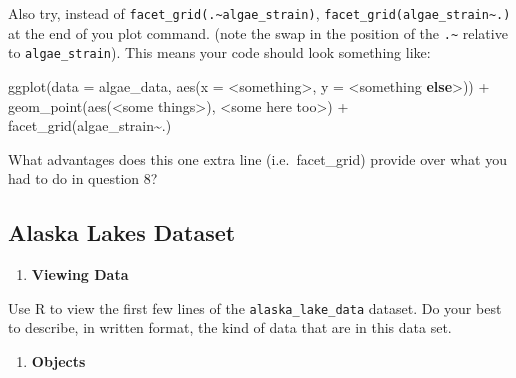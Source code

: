 \documentclass[
]{krantz}
\newenvironment{Shaded}{\begin{snugshade}}{\end{snugshade}}
\newcommand{\AttributeTok}[1]{\textcolor[rgb]{0.77,0.63,0.00}{#1}}
\newcommand{\ControlFlowTok}[1]{\textcolor[rgb]{0.13,0.29,0.53}{\textbf{#1}}}
\newcommand{\FunctionTok}[1]{\textcolor[rgb]{0.00,0.00,0.00}{#1}}
\newcommand{\NormalTok}[1]{#1}
\newcommand{\SpecialCharTok}[1]{\textcolor[rgb]{0.00,0.00,0.00}{#1}}
\providecommand{\tightlist}{%
  \setlength{\itemsep}{0pt}\setlength{\parskip}{0pt}}
\begin{document}
Also try, instead of \texttt{facet\_grid(.\textasciitilde{}algae\_strain)}, \texttt{facet\_grid(algae\_strain\textasciitilde{}.)} at the end of you plot command. (note the swap in the position of the \texttt{.\textasciitilde{}} relative to \texttt{algae\_strain}). This means your code should look something like:

\begin{Shaded}
\begin{Highlighting}[]
\FunctionTok{ggplot}\NormalTok{(}\AttributeTok{data =}\NormalTok{ algae\_data, }\FunctionTok{aes}\NormalTok{(}\AttributeTok{x =} \SpecialCharTok{\textless{}}\NormalTok{something}\SpecialCharTok{\textgreater{}}\NormalTok{, }\AttributeTok{y =} \SpecialCharTok{\textless{}}\NormalTok{something }\ControlFlowTok{else}\SpecialCharTok{\textgreater{}}\NormalTok{)) }\SpecialCharTok{+}
  \FunctionTok{geom\_point}\NormalTok{(}\FunctionTok{aes}\NormalTok{(}\SpecialCharTok{\textless{}}\NormalTok{some things}\SpecialCharTok{\textgreater{}}\NormalTok{), }\SpecialCharTok{\textless{}}\NormalTok{some here too}\SpecialCharTok{\textgreater{}}\NormalTok{) }\SpecialCharTok{+}
  \FunctionTok{facet\_grid}\NormalTok{(algae\_strain}\SpecialCharTok{\textasciitilde{}}\NormalTok{.)}
\end{Highlighting}
\end{Shaded}

What advantages does this one extra line (i.e.~facet\_grid) provide over what you had to do in question 8?

\hypertarget{alaska-lakes-dataset}{%
\subsection{Alaska Lakes Dataset}\label{alaska-lakes-dataset}}

\begin{enumerate}
\def\labelenumi{\arabic{enumi}.}
\tightlist
\item
  \textbf{Viewing Data}
\end{enumerate}

Use R to view the first few lines of the \texttt{alaska\_lake\_data} dataset. Do your best to describe, in written format, the kind of data that are in this data set.

\begin{enumerate}
\def\labelenumi{\arabic{enumi}.}
\setcounter{enumi}{1}
\tightlist
\item
  \textbf{Objects}
\end{enumerate}
\end{document}
